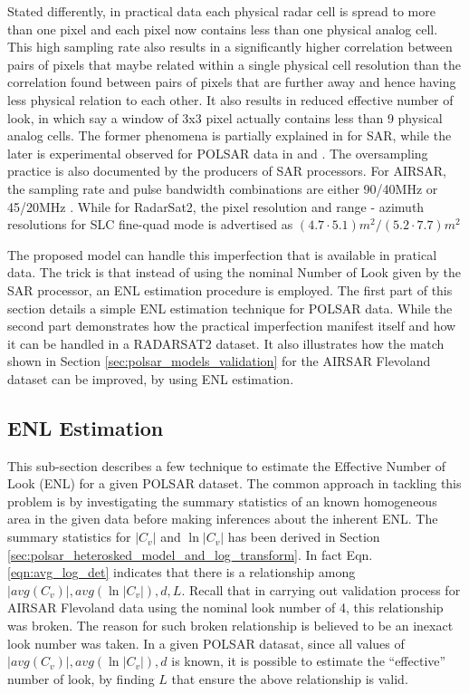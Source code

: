 \documentclass[journal]{IEEEtran}
\begin{document}
Stated differently, in practical data each physical radar cell is spread to more than one pixel
  and each pixel now contains less than one physical analog cell.
This high sampling rate also results in 
  a significantly higher correlation between pairs of pixels that maybe related within a single physical cell resolution 
  than the correlation found between pairs of pixels that are further away and hence having less physical relation to each other.
It also results in reduced effective number of look, 
  in which say a window of 3x3 pixel actually contains less than 9 physical analog cells. 
The former phenomena is partially explained in \cite{Raney_1988_TGRS_666} for SAR,
  while the later is experimental observed for POLSAR data in \cite{Lee_1994_TGRS_1017} and \cite{Anfinsen_2009_TGRS_3795}.
The oversampling practice is also documented by the producers of SAR processors.
For AIRSAR, the sampling rate and pulse bandwidth combinations are either 90/40MHz or 45/20MHz \cite{JPL_2013_Web_AIRSAR_Impl}.
While for RadarSat2, the pixel resolution and range - azimuth resolutions for SLC fine-quad mode is advertised as $(4.7 \cdot 5.1)m^2/(5.2 \cdot 7.7)m^2$ \cite{MDA_2013_Web_RadatSat2_Description}

The proposed model can handle this imperfection that is available in pratical data.
The trick is that instead of using the nominal Number of Look given by the SAR processor,
  an ENL estimation procedure is employed. %
The first part of this section details a simple ENL estimation technique for POLSAR data.
While the second part demonstrates how the practical imperfection manifest itself and how it can be handled in a RADARSAT2 dataset.
It also illustrates how the match shown in Section \ref{sec:polsar_models_validation} for the AIRSAR Flevoland dataset can be improved,
  by using ENL estimation.

\subsection{ENL Estimation}

This sub-section describes a few technique to estimate the Effective Number of Look (ENL) for a given POLSAR dataset.
The common approach in tackling this problem is by investigating the summary statistics of an known homogeneous area in the given data
  before making inferences about the inherent ENL.
The summary statistics for $|C_v|$ and $\ln|C_v|$ has been derived in Section \ref{sec:polsar_heterosked_model_and_log_transform}.
In fact Eqn. \ref{eqn:avg_log_det} indicates that there is a relationship among $|avg(C_v)|,avg(\ln|C_v|),d,L$.
Recall that in carrying out validation process for AIRSAR Flevoland data using the nominal look number of 4, this relationship was broken.
The reason for such broken relationship is believed to be an inexact look number was taken.
In a given POLSAR datasat, since all values of $|avg(C_v)|,avg(\ln|C_v|),d$ is known,
  it is possible to estimate the ``effective'' number of look, by finding $L$ that ensure the above relationship is valid.
\end{document}
